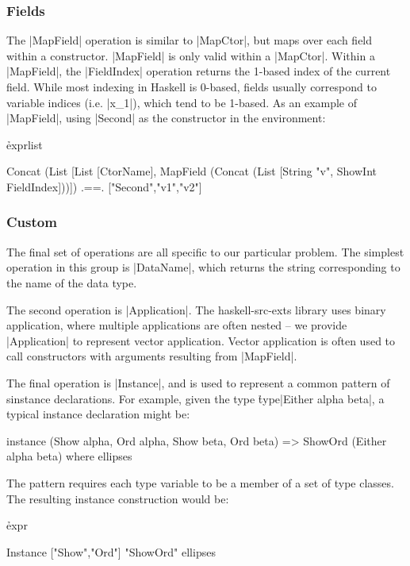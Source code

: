 \documentclass[preprint,draft]{sigplanconf}
\begin{document}
\subsubsection{Fields}

The |MapField| operation is similar to |MapCtor|, but maps over each field within a constructor. |MapField| is only valid within a |MapCtor|. Within a |MapField|, the |FieldIndex| operation returns the 1-based index of the current field. While most indexing in Haskell is 0-based, fields usually correspond to variable indices (i.e. |x_1|), which tend to be 1-based. As an example of |MapField|, using |Second| as the constructor in the environment:

\h{exprlist}\begin{code}
Concat (List [List [CtorName],
    MapField (Concat (List [String "v", ShowInt FieldIndex]))])
    .==. ["Second","v1","v2"]
\end{code}

\subsubsection{Custom}
\label{sec:dsl_custom}

The final set of operations are all specific to our particular problem. The simplest operation in this group is |DataName|, which returns the string corresponding to the name of the data type.

The second operation is |Application|. The haskell-src-exts library uses binary application, where multiple applications are often nested -- we provide |Application| to represent vector application. Vector application is often used to call constructors with arguments resulting from |MapField|.

The final operation is |Instance|, and is used to represent a common pattern of sinstance declarations. For example, given the type \h{type}|Either alpha beta|, a typical instance declaration might be:

\ignore\begin{code}
instance (Show alpha, Ord alpha, Show beta, Ord beta) =>
    ShowOrd (Either alpha beta) where ellipses
\end{code}

\noindent The pattern requires each type variable to be a member of a set of type classes. The resulting instance construction would be:

\h{expr}\begin{code}
Instance ["Show","Ord"] "ShowOrd" ellipses
\end{code}
\end{document}
